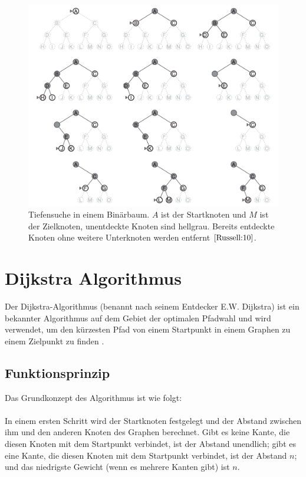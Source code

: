 \begin{figure}[H]
	\centering
	\includegraphics[width=1.0\textwidth]{images/tiefensuche.png}
	\caption{Tiefensuche in einem Binärbaum. $A$ ist der Startknoten und $M$ ist der Zielknoten, unentdeckte Knoten sind hellgrau. 
		Bereits entdeckte Knoten ohne weitere Unterknoten werden entfernt $\cite[85,86]{Russell:10}$.}
	\label{fig:Tiefensuche}
\end{figure}

\section{Dijkstra Algorithmus}
\label{Dijkstra Algorithmus}

Der Dijkstra-Algorithmus (benannt nach seinem Entdecker E.W. Dijkstra) ist ein bekannter Algorithmus auf dem Gebiet der optimalen
Pfadwahl und wird verwendet, um den kürzesten Pfad von einem Startpunkt in einem Graphen zu einem Zielpunkt zu finden \cite{Javaid2019}.

\subsection{Funktionsprinzip}

Das Grundkonzept des Algorithmus ist wie folgt:
\\ \\
In einem ersten Schritt wird der Startknoten festgelegt und der Abstand zwischen ihm und den anderen Knoten des Graphen berechnet. 
Gibt es keine Kante, die diesen Knoten mit dem Startpunkt verbindet, ist der Abstand unendlich; gibt es eine Kante, die 
diesen Knoten mit dem Startpunkt verbindet, ist der Abstand $n$; und das niedrigste Gewicht (wenn es mehrere Kanten gibt) ist $n$.

